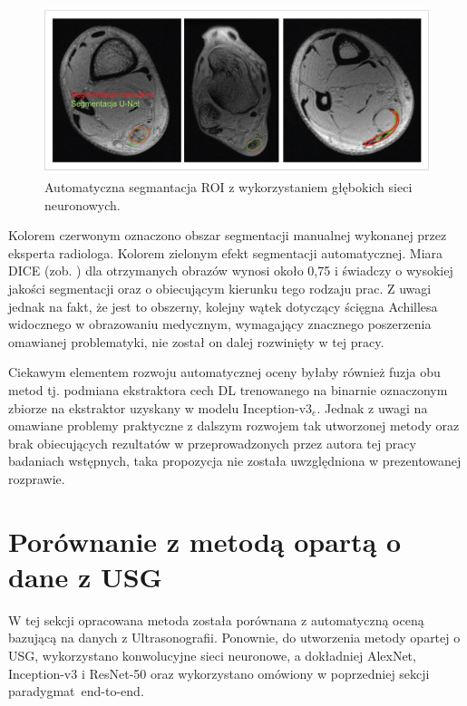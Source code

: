 \begin{figure}[h]
	\centering
	\includegraphics[width=1\textwidth]{figures/Segmentacja.jpg}
	\caption{Automatyczna segmantacja ROI z wykorzystaniem głębokich sieci neuronowych.}\label{fig:segmentacja}
\end{figure}

Kolorem czerwonym oznaczono obszar segmentacji manualnej wykonanej przez eksperta radiologa. Kolorem zielonym efekt segmentacji automatycznej. Miara DICE (zob. \cite{Zou2004}) dla otrzymanych obrazów wynosi około 0,75 i świadczy o wysokiej jakości segmentacji oraz o obiecującym kierunku tego rodzaju prac. Z uwagi jednak na fakt, że jest to obszerny, kolejny wątek dotyczący ścięgna Achillesa widocznego w obrazowaniu medycznym, wymagający znacznego poszerzenia omawianej problematyki, nie został on dalej rozwinięty w tej pracy.

Ciekawym elementem rozwoju automatycznej oceny byłaby również fuzja obu metod tj. podmiana ekstraktora cech DL trenowanego na binarnie oznaczonym zbiorze na ekstraktor uzyskany w modelu Inception-v3$_e$. Jednak z uwagi na omawiane problemy praktyczne z dalszym rozwojem tak utworzonej metody oraz brak obiecujących rezultatów w przeprowadzonych przez autora tej pracy badaniach wstępnych, taka propozycja nie została uwzględniona w prezentowanej rozprawie. 

\section{Porównanie z metodą opartą o dane z USG}
\label{seq:comp-usg}
W tej sekcji opracowana metoda została porównana z automatyczną oceną bazującą na danych z Ultrasonografii. Ponownie, do utworzenia metody opartej o USG, wykorzystano konwolucyjne sieci neuronowe, a dokładniej AlexNet, Inception-v3 \linebreak i ResNet-50 oraz wykorzystano omówiony w poprzedniej sekcji paradygmat~end-to-end. 

